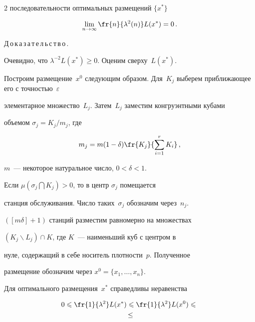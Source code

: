 \begin{multicols}{2}
{последовательности оптимальных размещений} $\{x^*\}$


$$


\liml{n\rightarrow\infty}\fr{n}{\lambda^2(n)}L(x^*)=0\,.


$$










\noindent


Д\,о\,к\,а\,з\,а\,т\,е\,л\,ь\,с\,т\,в\,о\,.\ 


Очевидно, что $\lambda^{-2} L(x^*) \geqslant 0$. Оценим сверху~$L(x^*)$. 


Построим размещение~$x^0$ следующим образом. Для~$K_j$ выберем при\-бли\-жа\-ющее его с точностью~$\varepsilon$ 


элементарное множество~$L_j$. Затем~$L_j$ заместим конгруэнтными кубами


объемом $\sigma_j=K_j/m_j$, где


$$


m_j=m(1-\delta) \fr{K_j}{\suml{i=1}{r}K_i}\,,


$$


$m$~--- некоторое натуральное число, $0<\delta<1$.


\pagebreak





Если $\mu(\sigma_j \bigcap K_j)>0$, то в центр $\sigma_j$ помещается


станция обслуживания. Число таких~$\sigma_j$ обозначим через~$n_j$.


$([m\delta]+1)$ станций разместим равномерно на множествах


$(K_j\backslash L_j)\cap K$, где $K$~--- наименьший куб с центром в


нуле, содержащий в себе носитель плотности~$p$. Полученное


размещение обозначим через $x^0=\{x_1,\ldots,x_n \}$.





Для оптимального размещения~$x^*$ справедливы неравенства


\begin{multline*}


0\leqslant\fr{1}{\lambda^2}L(x^*)\leqslant \fr{1}{\lambda^2} L(x^0)\leqslant {}\\


{}\leq



\end{multline*}
\end{multicols}
